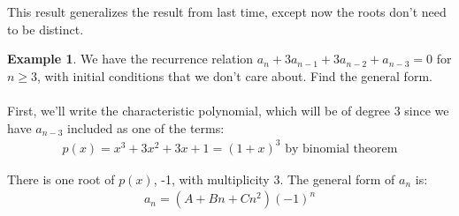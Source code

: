 \documentclass[]{article}
\theoremstyle{definition}
\newtheorem{ex}{Example}[section]
\begin{document}
		This result generalizes the result from last time, except now the roots don't need to be distinct.

		\begin{ex}
			We have the recurrence relation $a_n + 3a_{n - 1} + 3a_{n - 2} + a_{n - 3} = 0$ for $n \ge 3$, with initial conditions that we don't care about. Find the general form.
			\\ \\
			First, we'll write the characteristic polynomial, which will be of degree 3 since we have $a_{n - 3}$ included as one of the terms:
			\begin{align*}
				p(x) = x^3 + 3x^2 + 3x + 1 = (1 + x)^3 \text{ by binomial theorem}
			\end{align*}

			There is one root of $p(x)$, -1, with multiplicity 3. The general form of $a_n$ is: 
			\begin{align*}
				a_n = (A + Bn + Cn^2)(-1)^n
			\end{align*}
		\end{ex}
\end{document}
